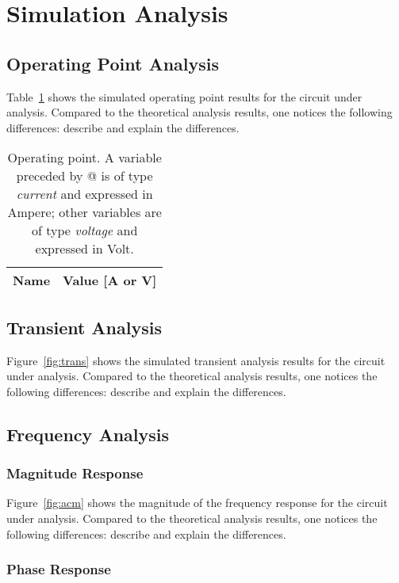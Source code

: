 \section{Simulation Analysis}
\label{sec:simulation}

\subsection{Operating Point Analysis}

Table~\ref{tab:op} shows the simulated operating point results for the circuit
under analysis. Compared to the theoretical analysis results, one notices the
following differences: describe and explain the differences.

\begin{table}[h]
  \centering
  \begin{tabular}{|l|r|}
    \hline    
    {\bf Name} & {\bf Value [A or V]} \\ \hline
    
  \end{tabular}
  \caption{Operating point. A variable preceded by @ is of type {\em current}
    and expressed in Ampere; other variables are of type {\it voltage} and expressed in
    Volt.}
  \label{tab:op}
\end{table}


\subsection{Transient Analysis}

Figure~\ref{fig:trans} shows the simulated transient analysis results for the
circuit under analysis. Compared to the theoretical analysis results, one
notices the following differences: describe and explain the differences.


\subsection{Frequency Analysis}

\subsubsection{Magnitude Response}

Figure~\ref{fig:acm} shows the magnitude of the frequency response for the
circuit under analysis. Compared to the theoretical analysis results, one
notices the following differences: describe and explain the differences.


\subsubsection{Phase Response}

